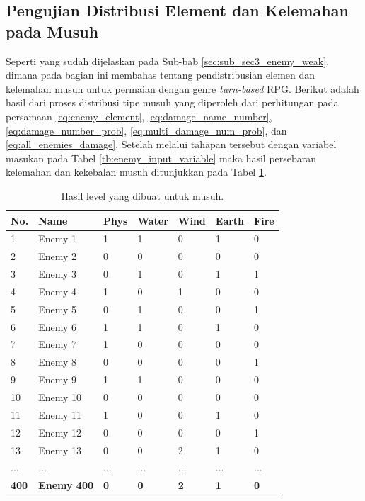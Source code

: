 \subsection{Pengujian Distribusi Element dan Kelemahan pada Musuh}
\label{sec:sub_sec4_eval_dist_enemy_element_and_weak}
\vspace{1ex}

Seperti yang sudah dijelaskan pada Sub-bab \ref{sec:sub_sec3_enemy_weak}, dimana pada bagian ini membahas tentang pendistribusian elemen dan kelemahan musuh untuk permaian dengan genre \textit{turn-based} RPG. Berikut adalah hasil dari proses distribusi tipe musuh yang diperoleh dari perhitungan pada persamaan \ref{eq:enemy_element}, \ref{eq:damage_name_number}, \ref{eq:damage_number_prob}, \ref{eq:multi_damage_num_prob}, dan \ref{eq:all_enemies_damage}. Setelah melalui tahapan tersebut dengan variabel masukan pada Tabel \ref{tb:enemy_input_variable} maka hasil persebaran kelemahan dan kekebalan musuh ditunjukkan pada Tabel \ref{tb:enemy_weak_distrib}.

\begin{longtable}{|l|l|l|l|l|l|l|}
	\caption{Hasil level yang dibuat untuk musuh.}
	\label{tb:enemy_weak_distrib}\\
	\hline
	\rowcolor[HTML]{C0C0C0} 
	\textbf{No.} & \textbf{Name} & \textbf{Phys} & \textbf{Water} & \textbf{Wind} & \textbf{Earth} & \textbf{Fire} \\ \hline
	1 & Enemy 1 & 1 & 1 & 0 & 1 & 0 \\ \hline
	2 & Enemy 2 & 0 & 0 & 0 & 0 & 0 \\ \hline
	3 & Enemy 3 & 0 & 1 & 0 & 1 & 1 \\ \hline
	4 & Enemy 4 & 1 & 0 & 1 & 0 & 0 \\ \hline
	5 & Enemy 5 & 0 & 1 & 0 & 0 & 1 \\ \hline
	6 & Enemy 6 & 1 & 1 & 0 & 1 & 0 \\ \hline
	7 & Enemy 7 & 1 & 0 & 0 & 0 & 0 \\ \hline
	8 & Enemy 8 & 0 & 0 & 0 & 0 & 1 \\ \hline
	9 & Enemy 9 & 1 & 1 & 0 & 0 & 0 \\ \hline
	10 & Enemy 10 & 0 & 0 & 0 & 0 & 0 \\ \hline
	11 & Enemy 11 & 1 & 0 & 0 & 1 & 0 \\ \hline
	12 & Enemy 12 & 0 & 0 & 0 & 0 & 1 \\ \hline
	13 & Enemy 13 & 0 & 0 & 2 & 1 & 0 \\ \hline
	... & ... & ... & ... & ... & ... & ... \\ \hline
	\textbf{400} & \textbf{Enemy 400} & \textbf{0} & \textbf{0} & \textbf{2} & \textbf{1} & \textbf{0} \\ \hline
\end{longtable}
\vspace{1ex}

